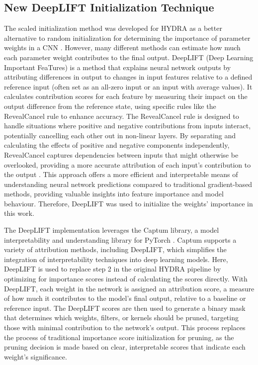 \documentclass[journal,onecolumn,12pt]{IEEEtran}
\begin{document}
\subsection{New DeepLIFT Initialization Technique}
The scaled initialization method was developed for HYDRA as a better alternative to random initialization for determining the importance of parameter weights in a CNN \cite{hydra}. However, many different methods can estimate how much each parameter weight contributes to the final output. DeepLIFT (Deep Learning Important FeaTures) \cite{deeplift} is a method that explains neural network outputs by attributing differences in output to changes in input features relative to a defined reference input (often set as an all-zero input or an input with average values). It calculates contribution scores for each feature by measuring their impact on the output difference from the reference state, using specific rules like the RevealCancel rule to enhance accuracy. The RevealCancel rule is designed to handle situations where positive and negative contributions from inputs interact, potentially cancelling each other out in non-linear layers. By separating and calculating the effects of positive and negative components independently, RevealCancel captures dependencies between inputs that might otherwise be overlooked, providing a more accurate attribution of each input’s contribution to the output \cite{deeplift}. This approach offers a more efficient and interpretable means of understanding neural network predictions compared to traditional gradient-based methods, providing valuable insights into feature importance and model behaviour. Therefore, DeepLIFT was used to initialize the weights' importance in this work. 

The DeepLIFT implementation leverages the Captum library, a model interpretability and understanding library for PyTorch \cite{captum}. Captum supports a variety of attribution methods, including DeepLIFT, which simplifies the integration of interpretability techniques into deep learning models. Here, DeepLIFT is used to replace step 2 in the original HYDRA pipeline by optimizing for importance scores instead of calculating the scores directly. With DeepLIFT, each weight in the network is assigned an attribution score, a measure of how much it contributes to the model’s final output, relative to a baseline or reference input. The DeepLIFT scores are then used to generate a binary mask that determines which weights, filters, or kernels should be pruned, targeting those with minimal contribution to the network's output. This process replaces the process of traditional importance score initialization for pruning, as the pruning decision is made based on clear, interpretable scores that indicate each weight’s significance.
\end{document}
